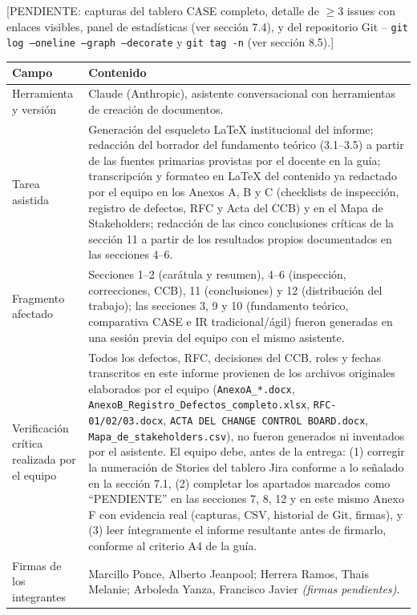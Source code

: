 \documentclass[11pt,a4paper]{article}
\newcommand{\subseccion}[1]{%
  \vspace{0.35cm}
  \noindent{\color{uteqverde}\textbf{\large #1}}\par
  \vspace{0.15cm}
}
\begin{document}
\subseccion{Anexo E -- Capturas}
\textcolor{uteqgris}{[PENDIENTE: capturas del tablero CASE completo, detalle de
$\geq$3 issues con enlaces visibles, panel de estadísticas (ver sección 7.4), y
del repositorio Git -- \texttt{git log --oneline --graph --decorate} y
\texttt{git tag -n} (ver sección 8.5).]}

\subseccion{Anexo F -- Declaración de uso de IA}
\begin{longtable}{p{4.3cm}p{8.5cm}}
\toprule
\textbf{Campo} & \textbf{Contenido} \\
\midrule
\endhead
Herramienta y versión & Claude (Anthropic), asistente conversacional con
herramientas de creación de documentos. \\
Tarea asistida & Generación del esqueleto LaTeX institucional del informe;
redacción del borrador del fundamento teórico (3.1--3.5) a partir de las
fuentes primarias provistas por el docente en la guía; transcripción y
formateo en LaTeX del contenido ya redactado por el equipo en los Anexos A, B
y C (checklists de inspección, registro de defectos, RFC y Acta del CCB) y en
el Mapa de Stakeholders; redacción de las cinco conclusiones críticas de la
sección 11 a partir de los resultados propios documentados en las secciones
4--6. \\
Fragmento afectado & Secciones 1--2 (carátula y resumen), 4--6 (inspección,
correcciones, CCB), 11 (conclusiones) y 12 (distribución del trabajo); las
secciones 3, 9 y 10 (fundamento teórico, comparativa CASE e IR
tradicional/ágil) fueron generadas en una sesión previa del equipo con el
mismo asistente. \\
Verificación crítica realizada por el equipo & Todos los defectos, RFC,
decisiones del CCB, roles y fechas transcritos en este informe provienen de
los archivos originales elaborados por el equipo (\texttt{AnexoA\_*.docx},
\texttt{AnexoB\_Registro\_Defectos\_completo.xlsx}, \texttt{RFC-01/02/03.docx},
\texttt{ACTA DEL CHANGE CONTROL BOARD.docx}, \texttt{Mapa\_de\_stakeholders.csv}),
no fueron generados ni inventados por el asistente. El equipo debe, antes de
la entrega: (1) corregir la numeración de Stories del tablero Jira conforme a
lo señalado en la sección 7.1, (2) completar los apartados marcados como
``PENDIENTE'' en las secciones 7, 8, 12 y en este mismo Anexo F con evidencia
real (capturas, CSV, historial de Git, firmas), y (3) leer íntegramente el
informe resultante antes de firmarlo, conforme al criterio A4 de la guía. \\
Firmas de los integrantes & Marcillo Ponce, Alberto Jeanpool; Herrera Ramos,
Thais Melanie; Arboleda Yanza, Francisco Javier
\textit{(firmas pendientes)}. \\
\bottomrule
\end{longtable}
\end{document}
